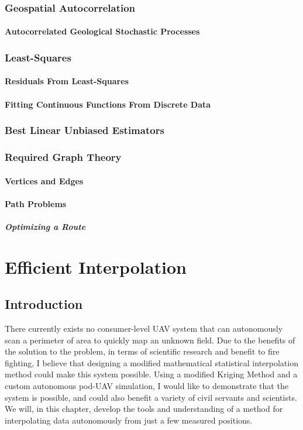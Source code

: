 \documentclass[11pt]{ucthesis}
\begin{document}
\section{Geospatial Autocorrelation}
\subsection{Autocorrelated Geological Stochastic Processes}

\section{Least-Squares}
\subsection{Residuals From Least-Squares}
\subsection{Fitting Continuous Functions From Discrete Data}

\section{Best Linear Unbiased Estimators}

\section{Required Graph Theory}
\subsection{Vertices and Edges}
\subsection{Path Problems}
\subsubsection{Optimizing a Route}

\part{Efficient Interpolation}

\chapter{Introduction}
There currently exists no consumer-level UAV system that can autonomously scan a perimeter of area to quickly map an unknown field. Due to the benefits of the solution to the problem, in terms of scientific research and benefit to fire fighting, I believe that designing a modified mathematical statistical interpolation method could make this system possible. Using a modified Kriging Method and a custom autonomous pod-UAV simulation, I would like to demonstrate that the system is possible, and could also benefit a variety of civil servants and scientists. We will, in this chapter, develop the tools and understanding of a method for interpolating data autonomously from just a few measured positions.
\end{document}
